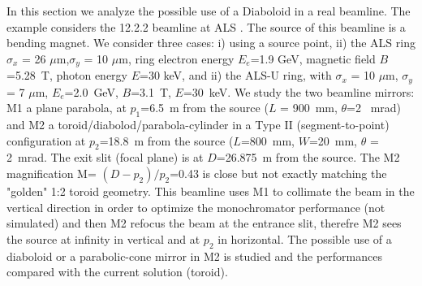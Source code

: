\documentclass[a4paper, 11pt]{article}
\begin{document}
In this section we analyze the possible use of a Diaboloid in a real beamline. The example considers the 12.2.2 beamline at ALS \cite{bl1222}. The source of this beamline is a bending magnet. We consider three cases: i) using a source point, ii) the ALS ring
$\sigma_x$ = 26 $\mu$m,$\sigma_y$ = 10 $\mu$m, ring electron energy $E_e$=1.9 GeV, magnetic field $B$=5.28~T, photon energy $E$=30 keV, and ii) the ALS-U ring, with $\sigma_x$ = 10 $\mu$m, $\sigma_y$ = 7 $\mu$m, $E_e$=2.0~GeV, $B$=3.1~T, $E$=30~keV. We study the two beamline mirrors: M1 a plane parabola, at $p_1$=6.5~m from the source ($L$ = 900~mm, $\theta$=2 ~mrad) and M2 a toroid/diabolod/parabola-cylinder in a Type II (segment-to-point) configuration at $p_2$=18.8~m from the source ($L$=800~mm, $W$=20~mm, $\theta$ = 2~mrad. The exit slit (focal plane) is at $D$=26.875~m from the source.  The M2 magnification M= $(D-p_2)/p_2$=0.43 is close but not exactly matching the "golden" 1:2 toroid geometry. This beamline uses M1 to collimate the beam in the vertical direction in order to optimize the monochromator performance (not simulated) and then M2 refocus the beam at the entrance slit, therefre M2 sees the source at infinity in vertical and at $p_2$ in horizontal. The possible use of a diaboloid or a parabolic-cone mirror in M2 is studied and the performances compared with the current solution (toroid).
\end{document}
